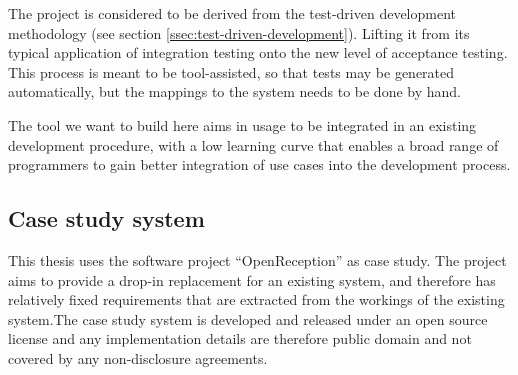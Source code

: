 \noindent The project is considered to be derived from the test-driven development methodology (see section \ref{ssec:test-driven-development}). Lifting it from its typical application of integration testing onto the new level of acceptance testing. This process is meant to be tool-assisted, so that tests may be generated automatically, but the mappings to the system needs to be done by hand.\medskip

\noindent The tool we want to build here aims in usage to be integrated in an existing development procedure, with a low learning curve that enables a broad range of programmers to gain better integration of use cases into the development process.

\subsection{Case study system}
\label{ssec:case-study-system-intro}
This thesis uses the software project ``OpenReception'' as case study. The project aims to provide a drop-in replacement for an existing system, and therefore has relatively fixed requirements that are extracted from the workings of the existing system.The case study system is developed and released under an open source license and any implementation details are therefore public domain and not covered by any non-disclosure agreements.

